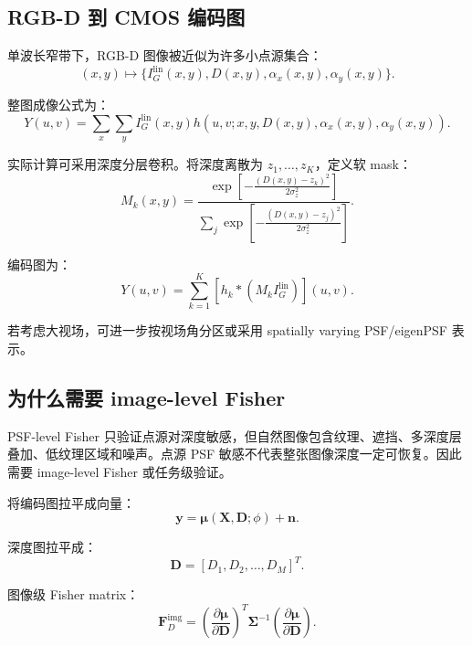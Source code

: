 \documentclass[11pt,a4paper,fontset=none]{ctexart}
\begin{document}
\subsection{RGB-D 到 CMOS 编码图}

单波长窄带下，RGB-D 图像被近似为许多小点源集合：
\begin{equation}
  (x,y)
  \mapsto
  \{I_G^{\mathrm{lin}}(x,y),D(x,y),\alpha_x(x,y),\alpha_y(x,y)\}.
\end{equation}

整图成像公式为：
\begin{equation}
  Y(u,v)
  =
  \sum_x\sum_y
  I_G^{\mathrm{lin}}(x,y)
  h
  \left(
  u,v;
  x,y,
  D(x,y),
  \alpha_x(x,y),
  \alpha_y(x,y)
  \right).
\end{equation}

实际计算可采用深度分层卷积。将深度离散为 $z_1,\ldots,z_K$，定义软 mask：
\begin{equation}
  M_k(x,y)
  =
  \frac{
  \exp\left[-\frac{(D(x,y)-z_k)^2}{2\sigma_z^2}\right]
  }{
  \sum_j
  \exp\left[-\frac{(D(x,y)-z_j)^2}{2\sigma_z^2}\right]
  }.
\end{equation}

编码图为：
\begin{equation}
\boxed{
  Y(u,v)
  =
  \sum_{k=1}^{K}
  \left[
  h_k*
  \left(
  M_k I_G^{\mathrm{lin}}
  \right)
  \right](u,v).
}
\end{equation}

若考虑大视场，可进一步按视场角分区或采用 spatially varying PSF/eigenPSF 表示。

\subsection{为什么需要 image-level Fisher}

PSF-level Fisher 只验证点源对深度敏感，但自然图像包含纹理、遮挡、多深度层叠加、低纹理区域和噪声。点源 PSF 敏感不代表整张图像深度一定可恢复。因此需要 image-level Fisher 或任务级验证。

将编码图拉平成向量：
\begin{equation}
  \bm y=
  \bm\mu(\bm X,\bm D;\phi)+\bm n.
\end{equation}

深度图拉平成：
\begin{equation}
  \bm D=[D_1,D_2,\ldots,D_M]^T.
\end{equation}

图像级 Fisher matrix：
\begin{equation}
\boxed{
  \bm F_D^{\mathrm{img}}
  =
  \left(
  \frac{\partial\bm\mu}{\partial\bm D}
  \right)^T
  \bm\Sigma^{-1}
  \left(
  \frac{\partial\bm\mu}{\partial\bm D}
  \right).
}
\end{equation}
\end{document}
